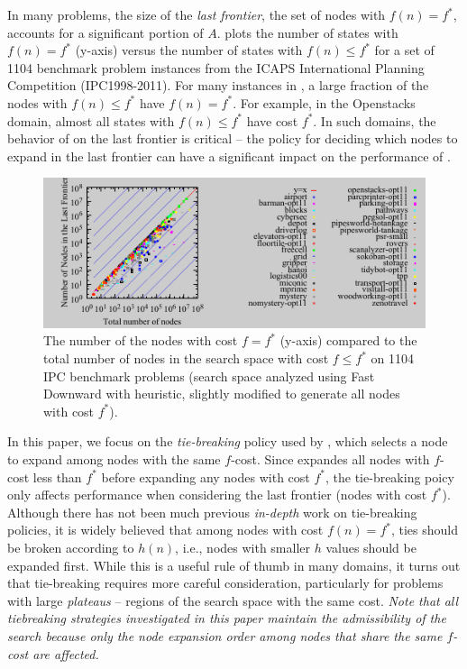 In many problems, the size of the \emph{last frontier}, the set of nodes with $f(n)=f^*$, accounts for a significant portion of $A$.
 plots the number of states with $f(n) = f^*$ (y-axis)
versus the number of states with $f(n) \leq f^*$
for a set of 1104 benchmark problem instances from the ICAPS International Planning Competition (IPC1998-2011).
For many instances in ,  a large fraction of the nodes with $f(n) \leq f^*$ have $f(n)=f^*$.
For example, in the Openstacks domain, almost all states with $f(n) \leq f^*$ have cost $f^*$.
In such domains, the behavior of \astar on the last frontier is critical -- the policy for deciding which nodes to expand in the last frontier can have a significant impact on the performance of \astar.

\begin{figure}[htb]
 \centering {} 
 \includegraphics{tables/aaai16-frontier/aaai16prelim3/lmcut_frontier_noh-front.pdf}
 \caption{
 The number of the nodes with cost $f=f^*$ (y-axis) compared to the
 total number of nodes in the search space with cost $f\leq f^*$ on 1104 IPC benchmark problems
(search space analyzed using Fast Downward with \lmcut heuristic, slightly modified to generate all nodes with cost $f^*$).}
\label{fig:plateau-noh}
\end{figure}

In this paper, we focus on the \emph{tie-breaking} policy used by
\astar, which selects a node to expand among nodes with the same
$f$-cost.  Since \astar expandes all nodes with $f$-cost less than $f^*$
before expanding any nodes with cost $f^*$, the tie-breaking poicy only
affects performance when considering the last frontier (nodes with cost
$f^*$).  Although there has not been much previous \emph{in-depth} work
on tie-breaking policies, it is widely believed that among nodes with
cost $f(n) = f^*$, ties should be broken according to $h(n)$, i.e.,
nodes with smaller $h$ values should be expanded first.  While this is a
useful rule of thumb in many domains, it turns out that tie-breaking
requires more careful consideration, particularly for problems with
large \emph{plateaus} -- regions of the search space with the same cost.
\emph{Note that all tiebreaking strategies investigated in this paper
maintain the admissibility of the search because only the node expansion
order among nodes that share the same $f$-cost are affected.}

